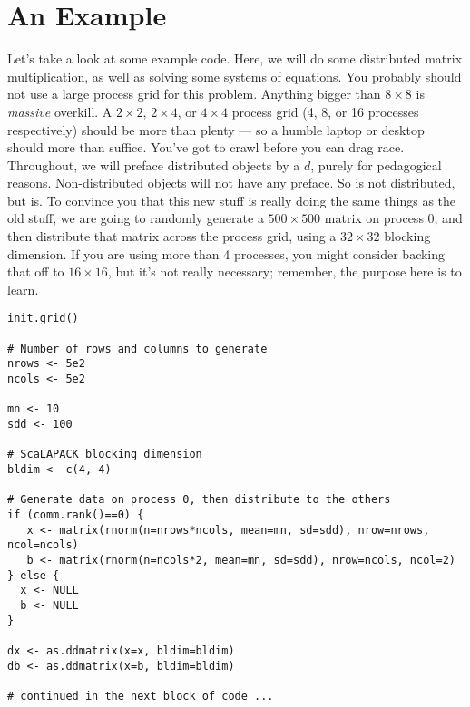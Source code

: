 \section[]{An Example}\label{secex}

Let's take a look at some example code.  Here, we will do some distributed matrix multiplication, as well as solving some systems of equations.  You probably should not use a large process grid for this problem.  Anything bigger than $8\times 8$ is \emph{massive} overkill.  A $2\times 2$, $2\times 4$, or $4\times 4$ process grid (4, 8, or 16 processes respectively) should be more than plenty --- so a humble laptop or desktop should more than suffice.  You've got to crawl before you can drag race.
\np
Throughout, we will preface distributed objects by a $d$, purely for pedagogical reasons.  Non-distributed objects will not have any preface.  So  is not distributed, but  is.
\np
To convince you that this new stuff is really doing the same things as the old stuff, we are going to randomly generate a $500\times 500$ matrix on process 0, and then distribute that matrix across the process grid, using a $32\times 32$ blocking dimension.  If you are using more than 4 processes, you might consider backing that off to $16\times 16$, but it's not really necessary; remember, the purpose here is to learn.

\begin{lstlisting}[language=rr,title=Generating Test Data]
init.grid() 

# Number of rows and columns to generate
nrows <- 5e2
ncols <- 5e2

mn <- 10
sdd <- 100

# ScaLAPACK blocking dimension
bldim <- c(4, 4)

# Generate data on process 0, then distribute to the others
if (comm.rank()==0) {
   x <- matrix(rnorm(n=nrows*ncols, mean=mn, sd=sdd), nrow=nrows, ncol=ncols)
   b <- matrix(rnorm(n=ncols*2, mean=mn, sd=sdd), nrow=ncols, ncol=2)
} else {
  x <- NULL  
  b <- NULL
}

dx <- as.ddmatrix(x=x, bldim=bldim)
db <- as.ddmatrix(x=b, bldim=bldim)

# continued in the next block of code ...
\end{lstlisting}

